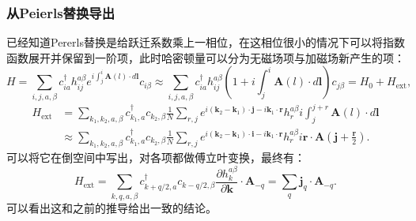 \documentclass[10pt,openany]{book}
\theoremstyle{thmstyle} %
\theoremstyle{defstyle} %
\theoremstyle{prostyle} %
\begin{document}
\subsubsection*{从Peierls替换导出}
已经知道Pererls替换是给跃迁系数乘上一相位，在这相位很小的情况下可以将指数函数展开并保留到一阶项，此时哈密顿量可以分为无磁场项与加磁场新产生的项：
\begin{equation}
	H=\sum_{i, j, a, \beta} c_{i a}^{\dagger} h_{i j}^{a \beta} e^{i \int_j^i \mathbf{A}(l) \cdot d \mathbf{l}} c_{i \beta} \approx \sum_{i, j, a, \beta} c_{i a}^{\dagger} h_{i j}^{a \beta}\left(1+i \int_j^i \mathbf{A}(l) \cdot d \mathbf{l}\right) c_{j \beta}=H_0+H_{\mathrm{ext}},
\end{equation}  
\begin{equation}
	\begin{aligned}
		H_{\mathrm{ext}} & =\sum_{k_1, k_2, a, \beta} c_{k_1, a}^{\dagger} c_{k_2, \beta} \frac{1}{N} \sum_{r, j} e^{i\left(\mathbf{k}_2-\mathbf{k}_1\right) \cdot \mathbf{j}-i \mathbf{k}_1 \cdot \mathbf{r}} h_r^{a \beta} i \int_j^{j+r} \mathbf{A}(l) \cdot d \mathbf{l} \\
		& \approx \sum_{k_1, k_2, a, \beta} c_{k_1, a}^{\dagger} c_{k_2, \beta} \frac{1}{N} \sum_{r, j} e^{i\left(\mathbf{k}_2-\mathbf{k}_1\right) \cdot \mathbf{i}-i \mathbf{k}_1 \cdot \mathbf{r}} h_r^{a \beta} i \mathbf{r} \cdot \mathbf{A}\left(\mathbf{j}+\frac{\mathbf{r}}{2}\right) .
		\end{aligned}
\end{equation}
可以将它在倒空间中写出，对各项都做傅立叶变换，最终有：
\begin{equation}
	H_{\mathrm{ext}}=\sum_{k, q, a, \beta} c_{k+q / 2, a}^{\dagger} c_{k-q / 2, \beta} \frac{\partial h_k^{a \beta}}{\partial \mathbf{k}} \cdot \mathbf{A}_{-q}=\sum_q \mathbf{j}_q \cdot \mathbf{A}_{-q} .
\end{equation}
可以看出这和之前的推导给出一致的结论。\\
\end{document}
